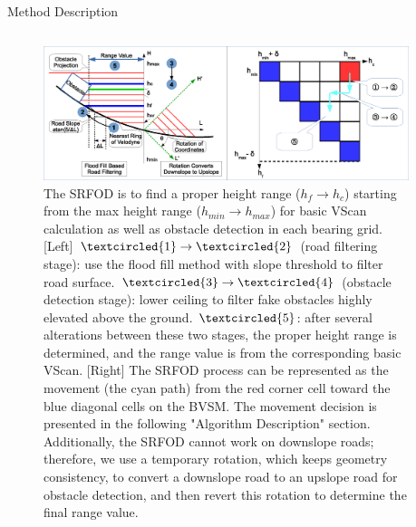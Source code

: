 \documentclass[final,hyperref={pdfpagelabels=false}]{beamer}
\begin{document}
\begin{frame}[t]
\begin{columns}[t]
\begin{column}{0.47\textwidth}
\begin{block}{Method Description}
\begin{center}
	\begin{column}{0.97\textwidth}
		\begin{figure}
			\centering
			\includegraphics[width=\textwidth]{SRFOD}
			\caption{The SRFOD is to find a proper height range ($h_f \rightarrow h_c$) starting from the max height range ($h_{min} \rightarrow h_{max}$) for basic VScan calculation as well as obstacle detection in each bearing grid. [Left] $\textcircled{1} \rightarrow \textcircled{2}$ (road filtering stage): use the flood fill method with slope threshold to filter road surface. $\textcircled{3} \rightarrow \textcircled{4}$ (obstacle detection stage): lower ceiling to filter fake obstacles highly elevated above the ground. $\textcircled{5}$: after several alterations between these two stages, the proper height range is determined, and the range value is from the corresponding basic VScan. [Right] The SRFOD process can be represented as the movement (the cyan path) from the red corner cell toward the blue diagonal cells on the BVSM. The movement decision is presented in the following "Algorithm Description" section. Additionally, the SRFOD cannot work on downslope roads; therefore, we use a temporary rotation, which keeps geometry consistency, to convert a downslope road to an upslope road for obstacle detection, and then revert this rotation to determine the final range value.}
		\end{figure}
	\end{column}
\end{center}



\end{block}


\end{column} %

\begin{column}{.02\textwidth}\end{column} %
 

\end{columns}
\end{frame}
\end{document}
